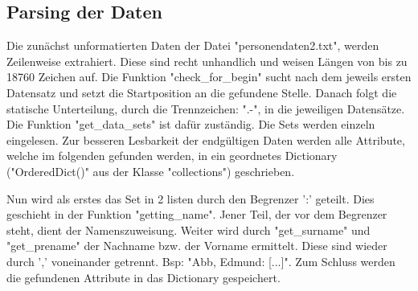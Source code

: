 \subsection{Parsing der Daten}
 \label{subsec:Parsing der Daten}

Die zunächst unformatierten Daten der Datei "{}personendaten2.txt"{}, werden Zeilenweise extrahiert. Diese sind recht unhandlich und weisen Längen von bis zu 18760 Zeichen auf. Die Funktion "{}check\_for\_begin"{} sucht nach dem jeweils ersten Datensatz und setzt die Startposition an die gefundene Stelle. Danach folgt die statische Unterteilung, durch die Trennzeichen: "{}.-"{}, in die jeweiligen Datensätze. Die Funktion "{}get\_data\_sets"{} ist dafür zuständig. Die Sets werden einzeln eingelesen. Zur besseren Lesbarkeit der endgültigen Daten werden alle Attribute, welche im folgenden gefunden werden, in ein geordnetes Dictionary ("{}OrderedDict()"{} aus der Klasse "{}collections"{}) geschrieben.

Nun wird als erstes das Set in 2 listen durch den Begrenzer '{}:'{} geteilt. Dies geschieht in der Funktion "{}getting\_name"{}. Jener Teil, der vor dem Begrenzer steht, dient der Namenszuweisung. Weiter wird durch "{}get\_surname"{} und "{}get\_prename"{} der Nachname bzw. der Vorname ermittelt. Diese sind wieder durch '{},'{} voneinander getrennt. Bsp: "{}Abb, Edmund: [...]"{}. Zum Schluss werden die gefundenen Attribute in das Dictionary gespeichert.


